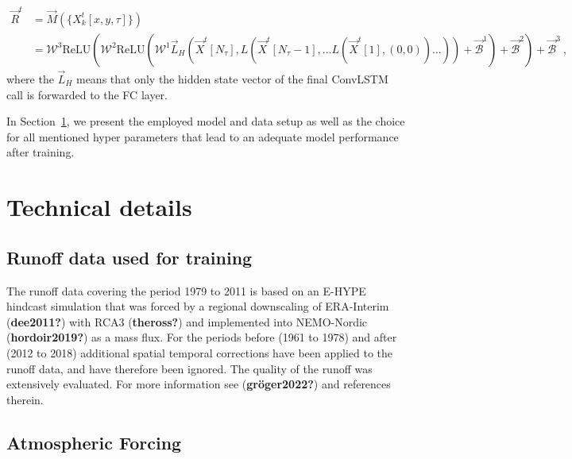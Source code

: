 \documentclass[
]{agujournal2019}
\begin{document}
\[
\begin{aligned}
\vec{R}^t & = \vec{M}(\{X^t_k[x,y,\tau]\}) \\
& = \pmb{\mathcal{W}}^{3}\mathrm{ReLU}\left(\pmb{\mathcal{W}}^{2}\mathrm{ReLU}\left(\pmb{\mathcal{W}}^{1} \vec{L}_H \left( \vec{X}^t[N_\tau], L \left( \vec{X}^t[N_\tau-1], \ldots L \left( \vec{X}^t[1], (0, 0) \right) \ldots \right) \right) + \vec{\mathcal{B}}^1\right) + \vec{\mathcal{B}}^2 \right) + \vec{\mathcal{B}}^3 \ ,
\end{aligned}
\] where the \(\vec{L}_H\) means that only the hidden state vector of
the final ConvLSTM call is forwarded to the FC layer.

In Section~\ref{sec-technical_details}, we present the employed model
and data setup as well as the choice for all mentioned hyper parameters
that lead to an adequate model performance after training.

\hypertarget{sec-technical_details}{%
\section{Technical details}\label{sec-technical_details}}

\hypertarget{runoff-data-used-for-training}{%
\subsection{Runoff data used for
training}\label{runoff-data-used-for-training}}

The runoff data covering the period 1979 to 2011 is based on an E-HYPE
hindcast simulation that was forced by a regional downscaling of
ERA-Interim (\textbf{dee2011?}) with RCA3 (\textbf{theross?}) and
implemented into NEMO-Nordic (\textbf{hordoir2019?}) as a mass flux. For
the periods before (1961 to 1978) and after (2012 to 2018) additional
spatial temporal corrections have been applied to the runoff data, and
have therefore been ignored. The quality of the runoff was extensively
evaluated. For more information see (\textbf{gröger2022?}) and
references therein.

\hypertarget{atmospheric-forcing}{%
\subsection{Atmospheric Forcing}\label{atmospheric-forcing}}
\end{document}
